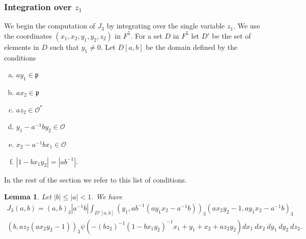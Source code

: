 \documentclass[12pt]{amsart}
\newcommand{\abs}[1]{\left|{#1}\right|}
\newcommand{\p}{\mathfrak{p}}
\renewcommand{\O}{\mathcal{O}}
\newtheorem{lemma}[theorem]{Lemma}
\theoremstyle{remark}
\begin{document}
\subsubsection{Integration over $z_1$}
We begin the computation of $J_3$ by integrating over the single variable $z_1$. We use the coordinates $(x_1,x_2,y_1,y_2,z_2)$ in $F^5$. For a set $D$ in $F^5$ let $D'$ be the set of elements in $D$ such that $y_1\ne 0$. Let $D[a,b]$ be the domain defined by the conditions
\begin{enumerate}[a)]
\item\label{dc1} $ay_1\in \p$
\item\label{dc2} $ax_2\in \p$
\item\label{dc3} $az_2\in \O^*$
\item\label{dc4} $y_1-a^{-1}by_2\in \O$
\item\label{dc5} $x_2-a^{-1}bx_1\in \O$
\item\label{dc6} $\abs{1-bx_1y_2}=\abs{ab^{-1}}$.
\end{enumerate}
In the rest of the section we refer to this list of conditions. 
\begin{lemma}\label{lem z1int}
Let $\abs{b}\le \abs{a}<1$. We have
\begin{multline*}
J_3(a,b)=(a,b)_3\abs{a^{-1}b}\int_{D'[a,b]}(y_1,ab^{-1}(ay_1x_2-a^{-1}b))_3(ax_2y_2-1,ay_1x_2-a^{-1}b)_3\\ (b,az_2(ax_2y_2-1))_3  \psi(-(b z_2)^{-1}(1-bx_1y_2)^{-1}x_1+y_1+x_2+az_2y_2)dx_1\ dx_2\ dy_1\ dy_2\ dz_2.
\end{multline*}
\end{lemma}
\end{document}
